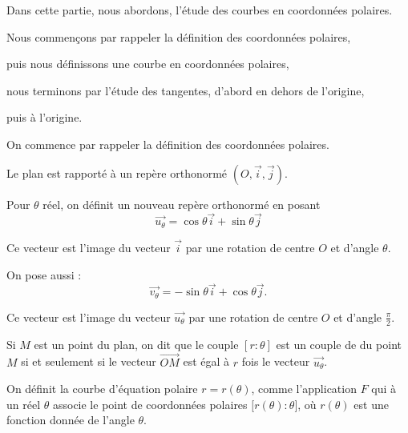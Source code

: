 






\debuttexte


\diapo

\change
Dans cette partie, nous abordons,  
l'étude des courbes en coordonnées polaires.


\change

Nous commençons par rappeler la définition 
des coordonnées polaires,

\change
puis nous définissons 
une courbe en coordonnées polaires,

\change
nous terminons par l'étude des tangentes, 
d'abord en dehors de l'origine,

\change
puis à l'origine.

\diapo

On commence par rappeler 
la définition des coordonnées polaires. 

Le plan est rapporté à un repère orthonormé 
$(O,\overrightarrow{i},\overrightarrow{j})$. 

Pour $\theta$ réel, on définit un nouveau repère orthonormé en posant
$$\overrightarrow{u_\theta}=\cos\theta\overrightarrow{i}+\sin\theta\overrightarrow{j}$$

Ce vecteur est l'image du vecteur 
$\overrightarrow{i}$ par une rotation 
de centre $O$ et d'angle $\theta$.

\change
On pose aussi :
$$\overrightarrow{v_\theta}=-\sin\theta\overrightarrow{i}
+\cos\theta\overrightarrow{j}.$$ 

Ce vecteur est l'image du vecteur 
$\overrightarrow{u_\theta}$ par une rotation de centre 
$O$ et d'angle $\frac{\pi}{2}$.

\change


Si $M$ est un point du plan, on dit que le couple $[r:\theta]$ est un 
couple de  du point $M$ si et seulement 
si le vecteur $\overrightarrow{OM}$ est égal à $r$ fois le vecteur $\overrightarrow{u_\theta}$. 



\diapo

On définit la courbe d'équation polaire $r=r(\theta)$, 
comme  l'application $F$ qui à un réel $\theta$ associe 
le point de coordonnées polaires $ \big[r(\theta):\theta\big]$,
où $r(\theta)$ est une fonction donnée de l'angle $\theta$.



